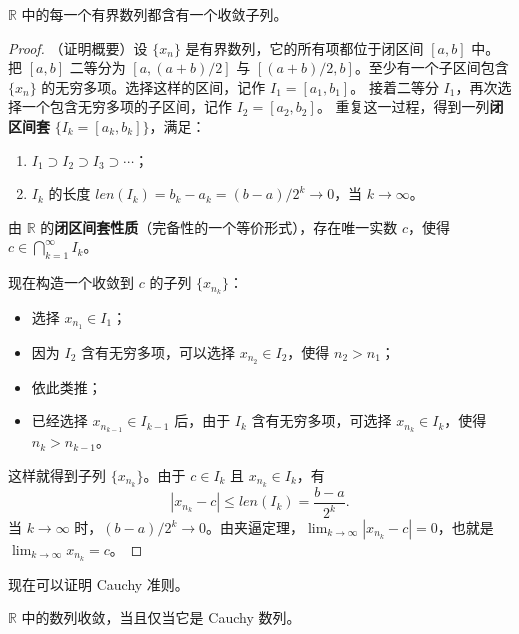 \begin{theorem}
\label{thm:bw_cn}
$\mathbb{R}$ 中的每一个有界数列都含有一个收敛子列。
\end{theorem}

\begin{proof}
（证明概要）设 $\{x_n\}$ 是有界数列，它的所有项都位于闭区间 $[a,b]$ 中。
把 $[a,b]$ 二等分为 $[a,(a+b)/2]$ 与 $[(a+b)/2,b]$。至少有一个子区间包含 $\{x_n\}$ 的无穷多项。选择这样的区间，记作 $I_1=[a_1,b_1]$。
接着二等分 $I_1$，再次选择一个包含无穷多项的子区间，记作 $I_2=[a_2,b_2]$。
重复这一过程，得到一列\textbf{闭区间套} $\{I_k=[a_k,b_k]\}$，满足：
\begin{enumerate}
    \item $I_1\supset I_2\supset I_3\supset \cdots$；
    \item $I_k$ 的长度 $len(I_k)=b_k-a_k=(b-a)/2^k\to 0$，当 $k\to \infty$。
\end{enumerate}
由 $\mathbb{R}$ 的\textbf{闭区间套性质}（完备性的一个等价形式），存在唯一实数 $c$，使得 $c\in \bigcap_{k=1}^{\infty}I_k$。

现在构造一个收敛到 $c$ 的子列 $\{x_{n_k}\}$：
\begin{itemize}
    \item 选择 $x_{n_1}\in I_1$；
    \item 因为 $I_2$ 含有无穷多项，可以选择 $x_{n_2}\in I_2$，使得 $n_2>n_1$；
    \item 依此类推；
    \item 已经选择 $x_{n_{k-1}}\in I_{k-1}$ 后，由于 $I_k$ 含有无穷多项，可选择 $x_{n_k}\in I_k$，使得 $n_k>n_{k-1}$。
\end{itemize}
这样就得到子列 $\{x_{n_k}\}$。由于 $c\in I_k$ 且 $x_{n_k}\in I_k$，有
\[
|x_{n_k}-c|\le len(I_k)=\frac{b-a}{2^k}.
\]
当 $k\to \infty$ 时，$(b-a)/2^k\to 0$。由夹逼定理，$\lim_{k\to \infty}|x_{n_k}-c|=0$，也就是 $\lim_{k\to \infty}x_{n_k}=c$。
\end{proof}

现在可以证明 Cauchy 准则。

\begin{theorem}
\label{thm:cauchy_cn}
$\mathbb{R}$ 中的数列收敛，当且仅当它是 Cauchy 数列。
\end{theorem}

